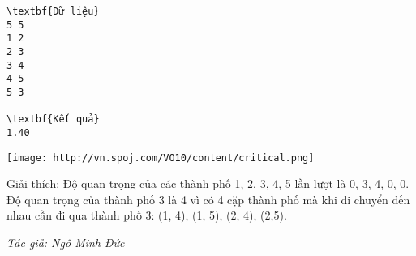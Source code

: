 \begin{verbatim}
\textbf{Dữ liệu}
5 5
1 2
2 3
3 4
4 5
5 3

\textbf{Kết quả}
1.40

\end{verbatim}


\texttt{[image: http://vn.spoj.com/VO10/content/critical.png]}

Giải thích: Độ quan trọng của các thành phố 1, 2, 3, 4, 5 lần lượt là 0, 3, 4, 0, 0. Độ quan trọng của thành phố 3 là 4 vì có 4 cặp thành phố mà khi di chuyển đến nhau cần đi qua thành phố 3: (1, 4), (1, 5), (2, 4), (2,5).

\emph{Tác giả: Ngô Minh Đức }